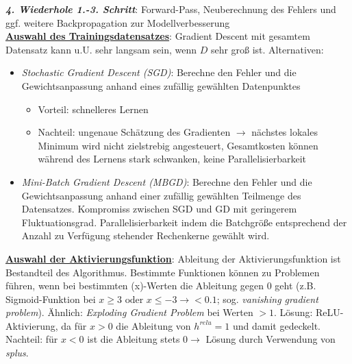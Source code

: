 \emph{\textbf{4. Wiederhole 1.-3. Schritt}}: Forward-Pass, Neuberechnung des Fehlers und ggf. weitere Backpropagation zur Modellverbesserung\\

\underline{\textbf{Auswahl des Trainingsdatensatzes}}: Gradient Descent mit gesamtem Datensatz kann u.U. sehr langsam sein, wenn $D$ sehr groß ist. Alternativen:
\begin{itemize}
    \item \emph{Stochastic Gradient Descent (SGD)}: Berechne den Fehler und die Gewichtsanpassung anhand eines zufällig gewählten Datenpunktes
    \begin{itemize}
        \item Vorteil: schnelleres Lernen
        \item Nachteil: ungenaue Schätzung des Gradienten $\rightarrow$ nächstes lokales Minimum wird nicht zielstrebig angesteuert, Gesamtkosten können während des Lernens stark schwanken, keine Parallelisierbarkeit
    \end{itemize}
    \item \emph{Mini-Batch Gradient Descent (MBGD)}: Berechne den Fehler und die Gewichtsanpassung anhand einer zufällig gewählten Teilmenge des Datensatzes. Kompromiss zwischen SGD und GD mit geringerem Fluktuationsgrad. Parallelisierbarkeit indem die Batchgröße entsprechend der Anzahl zu Verfügung stehender Rechenkerne gewählt wird.
\end{itemize}

\underline{\textbf{Auswahl der Aktivierungsfunktion}}: Ableitung der Aktivierungsfunktion ist Bestandteil des Algorithmus. Bestimmte Funktionen können zu Problemen führen, wenn bei bestimmten (x)-Werten die Ableitung gegen 0 geht (z.B. Sigmoid-Funktion bei $x\geq3 \text{ oder } x\leq-3\rightarrow<0.1$; sog. \emph{vanishing gradient problem}). Ähnlich: \emph{Exploding Gradient Problem} bei Werten $>1$. Lösung: ReLU-Aktivierung, da für $x>0$ die Ableitung von $h^{relu}=1$ und damit gedeckelt. Nachteil: für $x<0$ ist die Ableitung stets $0\rightarrow$ Lösung durch Verwendung von \emph{splus}.